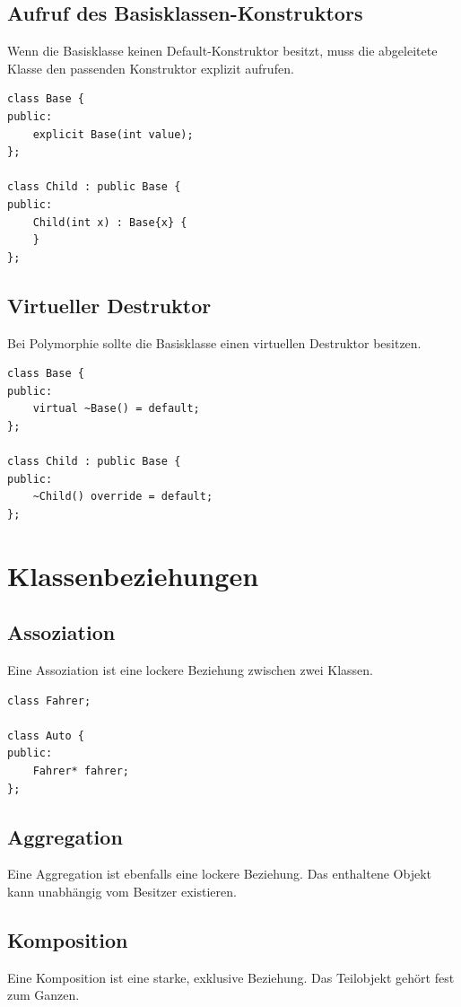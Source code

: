 \documentclass[11pt,a4paper]{article}
\begin{document}
\subsection{Aufruf des Basisklassen-Konstruktors}
Wenn die Basisklasse keinen Default-Konstruktor besitzt, muss die abgeleitete Klasse den passenden Konstruktor explizit aufrufen.

\begin{lstlisting}[caption={Basisklassen-Konstruktor aufrufen}]
class Base {
public:
    explicit Base(int value);
};

class Child : public Base {
public:
    Child(int x) : Base{x} {
    }
};
\end{lstlisting}

\subsection{Virtueller Destruktor}
Bei Polymorphie sollte die Basisklasse einen virtuellen Destruktor besitzen.

\begin{lstlisting}[caption={Virtueller Destruktor}]
class Base {
public:
    virtual ~Base() = default;
};

class Child : public Base {
public:
    ~Child() override = default;
};
\end{lstlisting}

\section{Klassenbeziehungen}

\subsection{Assoziation}
Eine Assoziation ist eine lockere Beziehung zwischen zwei Klassen.

\begin{lstlisting}[caption={Assoziation}]
class Fahrer;

class Auto {
public:
    Fahrer* fahrer;
};
\end{lstlisting}

\subsection{Aggregation}
Eine Aggregation ist ebenfalls eine lockere Beziehung. Das enthaltene Objekt kann unabhängig vom Besitzer existieren.

\subsection{Komposition}
Eine Komposition ist eine starke, exklusive Beziehung. Das Teilobjekt gehört fest zum Ganzen.
\end{document}
